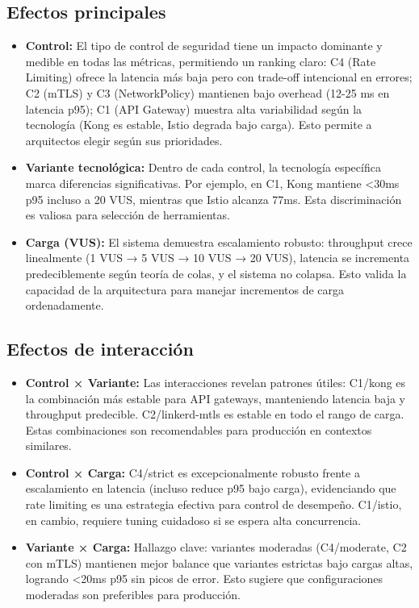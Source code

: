 \subsection{Efectos principales}
\begin{itemize}
	\item \textbf{Control:} El tipo de control de seguridad tiene un impacto dominante y medible en todas las métricas, permitiendo un ranking claro: C4 (Rate Limiting) ofrece la latencia más baja pero con trade-off intencional en errores; C2 (mTLS) y C3 (NetworkPolicy) mantienen bajo overhead (12-25 ms en latencia p95); C1 (API Gateway) muestra alta variabilidad según la tecnología (Kong es estable, Istio degrada bajo carga). Esto permite a arquitectos elegir según sus prioridades.
	\item \textbf{Variante tecnológica:} Dentro de cada control, la tecnología específica marca diferencias significativas. Por ejemplo, en C1, Kong mantiene <30ms p95 incluso a 20 VUS, mientras que Istio alcanza 77ms. Esta discriminación es valiosa para selección de herramientas.
	\item \textbf{Carga (VUS):} El sistema demuestra escalamiento robusto: throughput crece linealmente (1 VUS → 5 VUS → 10 VUS → 20 VUS), latencia se incrementa predeciblemente según teoría de colas, y el sistema no colapsa. Esto valida la capacidad de la arquitectura para manejar incrementos de carga ordenadamente.
\end{itemize}

\subsection{Efectos de interacción}
\begin{itemize}
	\item \textbf{Control × Variante:} Las interacciones revelan patrones útiles: C1/kong es la combinación más estable para API gateways, manteniendo latencia baja y throughput predecible. C2/linkerd-mtls es estable en todo el rango de carga. Estas combinaciones son recomendables para producción en contextos similares.
	\item \textbf{Control × Carga:} C4/strict es excepcionalmente robusto frente a escalamiento en latencia (incluso reduce p95 bajo carga), evidenciando que rate limiting es una estrategia efectiva para control de desempeño. C1/istio, en cambio, requiere tuning cuidadoso si se espera alta concurrencia.
	\item \textbf{Variante × Carga:} Hallazgo clave: variantes moderadas (C4/moderate, C2 con mTLS) mantienen mejor balance que variantes estrictas bajo cargas altas, logrando <20ms p95 sin picos de error. Esto sugiere que configuraciones moderadas son preferibles para producción.
\end{itemize}

